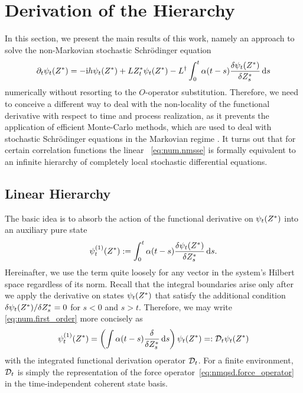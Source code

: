 \section{Derivation of the Hierarchy}
\label{sec:num.sheom}
%

In this section, we present the main results of this work, namely an approach to solve the non-Markovian stochastic Schrödinger equation
\begin{equation}
  \partial_t \psitZ = -\ii h \psitZ + L\ZZ_t \psitZ - \adj{L}\int_0^t \alpha(t-s) \frac{\delta\psitZ}{\delta\ZZ_s} \dd s
  \label{eq:num.nmsse}
\end{equation}
numerically without resorting to the $O$-operator substitution.
Therefore, we need to conceive a different way to deal with the non-locality of the functional derivative with respect to time and process realization, as it prevents the application of efficient Monte-Carlo methods, which are used to deal with stochastic Schrödinger equations in the Markovian regime \cite{Ca93_quantum_optics,Pe98_qsd}.
It turns out that for certain correlation functions the linear \NMSSE~\ref{eq:num.nmsse} is formally equivalent to an infinite hierarchy of completely local stochastic differential equations.

\subsection{Linear Hierarchy}
\label{sub:num.sheom.lin}
%

The basic idea is to absorb the action of the functional derivative on $\psitZ$ into an auxiliary pure state
\begin{equation}
  \psitZ[1] := \int_0^t \alpha(t - s) \frac{\delta \psi_t(\ZZ)}{\delta \ZZ_s} \dd s.
  \label{eq:num.first_order}
\end{equation}
Hereinafter, we use the term  quite loosely for any vector in the system's Hilbert space regardless of its norm.
Recall that the integral boundaries arise only after we apply the derivative on states $\psi_t({Z}^*)$ that satisfy the additional condition $\delta \psitZ / \delta \ZZ_s = 0$ for $ s < 0$ and $s > t$.
Therefore, we may write \autoref{eq:num.first_order} more concisely as
\begin{equation*}
  \psitZ[1] = \left( \int \alpha(t - s) \frac{\delta}{\delta \ZZ_s} \dd s \right) \psitZ =: \adjZZ_t \psitZ
\end{equation*}
with the integrated functional derivation operator $\mathcal{D}_t$.
For a finite environment, $\mathcal{D}_t$ is simply the representation of the force operator~\ref{eq:nmqsd.force_operator} in the time-independent coherent state basis.

